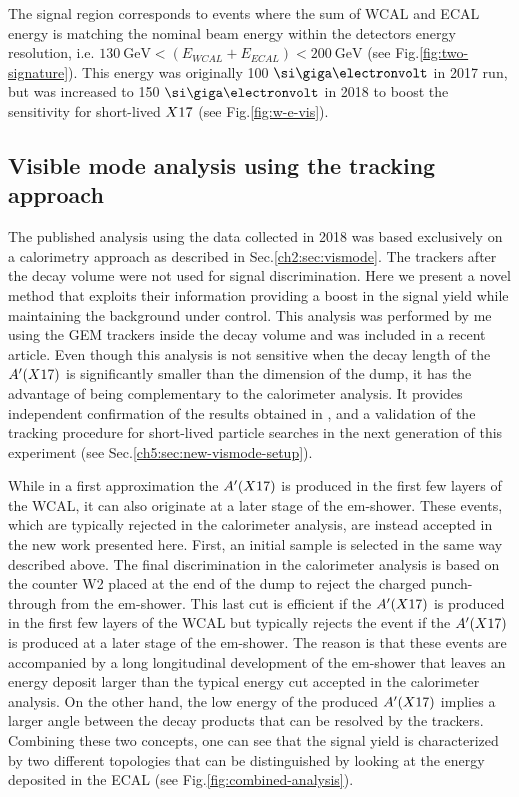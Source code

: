 The signal region corresponds to events where the sum of WCAL and ECAL energy is matching the nominal beam energy within the detectors energy resolution, i.e. $\SI{130}{\giga\electronvolt} < (E_{WCAL} + E_{ECAL}) < \SI{200}{\giga\electronvolt}$ (see Fig.\ref{fig:two-signature}). This energy was originally 100 $\gev$ in 2017 run, but was increased to 150 $\gev$ in 2018 to boost the sensitivity for short-lived $X17$ (see Fig.\ref{fig:w-e-vis}).

\subsection{Visible mode analysis using the tracking approach}
\label{ch3:sec:vis-mode-tracking}

The published analysis using the data collected in 2018 \cite{Banerjee:2019hmi} was based exclusively on a calorimetry approach as described in Sec.\ref{ch2:sec:vismode}. The trackers after the decay volume were not used for signal discrimination. Here we present a novel method that exploits their information providing a boost in the signal yield while maintaining the background under control. This analysis was performed by me using the GEM trackers inside the decay volume and was included in a recent article. Even though this analysis is not sensitive when the decay length of the $A'(X17)$ is significantly smaller than the dimension of the dump, it has the advantage of being complementary to the calorimeter analysis. It provides independent confirmation of the results obtained in \cite{Banerjee:2019hmi}, and a validation of the tracking procedure for short-lived particle searches in the next generation of this experiment (see Sec.\ref{ch5:sec:new-vismode-setup}).

While in a first approximation the $A'(X17)$ is produced in the first few layers of the WCAL, it can also originate at a later stage of the em-shower. These events, which are typically rejected in the calorimeter analysis, are instead accepted in the new work presented here. First, an initial sample is selected in the same way described above. The final discrimination in the calorimeter analysis is based on the counter W2 placed at the end of the dump to reject the charged punch-through from the em-shower. This last cut is efficient if the $A'(X17)$ is produced in the first few layers of the WCAL but typically rejects the event if the $A'(X17)$ is produced at a later stage of the em-shower. The reason is that these events are accompanied by a long longitudinal development of the em-shower that leaves an energy deposit larger than the typical energy cut accepted in the calorimeter analysis. On the other hand, the low energy of the produced $A'(X17)$ implies a larger angle between the decay products that can be resolved by the trackers. Combining these two concepts, one can see that the signal yield is characterized by two different topologies that can be distinguished by looking at the energy deposited in the ECAL (see Fig.\ref{fig:combined-analysis}).

